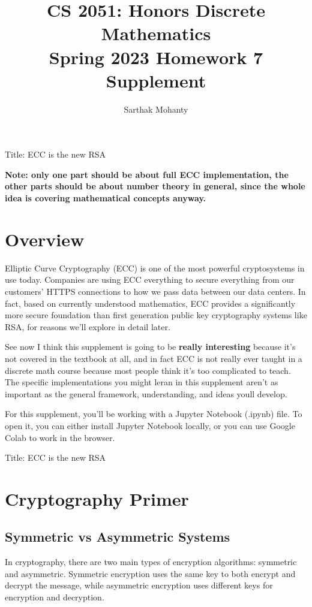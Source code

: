 \documentclass{article}
\title{\vspace{-1cm}CS 2051: Honors Discrete Mathematics \\Spring 2023 Homework 7 Supplement}
\author{Sarthak Mohanty }
\date{}
\begin{document}
\maketitle


Title: ECC is the new RSA

\textbf{Note: only one part should be about full ECC implementation, the other parts should be about number theory in general, since the whole idea is covering mathematical concepts anyway.}

\section*{Overview}

Elliptic Curve Cryptography (ECC) is one of the most powerful cryptosystems in use today. Companies are using ECC everything to secure everything from our customers' HTTPS connections to how we pass data between our data centers. In fact, based on currently understood mathematics, ECC provides a significantly more secure foundation than first generation public key cryptography systems like RSA, for reasons we'll explore in detail later.

\vspace{2mm}
See now I think this supplement is going to be \textbf{really interesting} because it's not covered in the textbook at all, and in fact ECC is not really ever taught in a discrete math course because most people think it's too complicated to teach. The specific implementations you might leran in this supplement aren't as important as the general framework, understanding, and ideas youll develop.

\vspace{2mm}
For this supplement, you'll be working with a Jupyter Notebook (.ipynb) file. To open it, you can either install Jupyter Notebook locally, or you can use Google Colab to work in the browser.


Title: ECC is the new RSA


\section*{Cryptography Primer}


\subsection*{Symmetric vs Asymmetric Systems}

In cryptography, there are two main types of encryption algorithms: symmetric and asymmetric. Symmetric encryption uses the same key to both encrypt and decrypt the message, while asymmetric encryption uses different keys for encryption and decryption.
\end{document}
